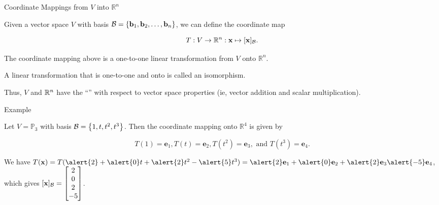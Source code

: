 \documentclass[xcolor=dvipsnames,aspectratio=169,t]{beamer}
\begin{document}
\begin{frame}{Coordinate Mappings from $V$ into $\mathbb{R}^n$}
  \bigskip

  Given a vector space $V$ with basis $\mathcal{B} = \left\{ \mathbf{b}_1 ,  \mathbf{b}_2 , \ldots ,  \mathbf{b}_n \right\} $, we can define the coordinate map

  \[ T: V \to \mathbb{R}^n: \mathbf{x} \mapsto \lbrack \mathbf{x} \rbrack_{\mathcal{B}}.\]
  \vspace*{-1em}  %

  \bbox
  The coordinate mapping above is a \alert{one-to-one} linear transformation from $V$ \alert{onto} $\mathbb{R}^n$. 

  A linear transformation that is  one-to-one and onto is called an \alert{isomorphism}.
  \ebox
  \bigskip
  
  Thus, $V$ and $\mathbb{R}^n$ have the ``'' with respect to vector space properties (ie, vector addition and scalar multiplication).
\end{frame}


\begin{frame}{Example}
  \bigskip

  Let $V = \mathbb{P}_3$ with basis $\mathcal{B} = \left\{ 1, t, t^2, t^3 \right\}$. 
  Then the coordinate mapping onto $\mathbb{R}^4$ is given by

  \[ T(1) = \mathbf{e}_1 , T(t) = \mathbf{e}_2 ,T(t^2) = \mathbf{e}_3 , \mbox{ and } T(t^3) = \mathbf{e}_4.\]
  \bigskip

  \bigskip

  \pause
  We have $T(\mathbf{x}) = T(\alert{2} + \alert{0}t + \alert{2}t^2-\alert{5}t^3)= \alert{2} \mathbf{e}_1 + \alert{0}  \mathbf{e}_2+ \alert{2}  \mathbf{e}_3 \alert{- 5} \mathbf{e}_4  $, which gives \alert{$ \lbrack \mathbf{x} \rbrack_{\mathcal{B}} = \begin{bmatrix} 2\\ 0 \\ 2 \\ -5 \end{bmatrix}$}.
\end{frame}
\end{document}
